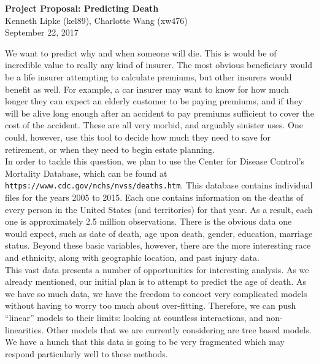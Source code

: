 \documentclass{article}
\begin{document}
\begin{center}
{\LARGE \textbf{Project Proposal: Predicting Death}}\\
{\large Kenneth Lipke (kel89), Charlotte Wang (xw476)}\\
September 22, 2017
\end{center}

We want to predict why and when someone will die. This is would be of incredible value to really any kind of insurer. The most obvious beneficiary would be a life insurer attempting to calculate premiums, but other insurers would benefit as well. For example, a car insurer may want to know for how much longer they can expect an elderly customer to be paying premiums, and if they will be alive long enough after an accident to pay premiums sufficient to cover the cost of the accident. These are all very morbid, and arguably sinister uses. One could, however, use this tool to decide how much they need to save for retirement, or when they need to begin estate planning. \\

In order to tackle this question, we plan to use the Center for Disease Control's Mortality Database, which can be found at \texttt{https://www.cdc.gov/nchs/nvss/deaths.htm}. This database contains individual files for the years 2005 to 2015. Each one contains information on the deaths of every person in the United States (and territories) for that year. As a result, each one is approximately 2.5 million observations. There is the obvious data one would expect, such as date of death, age upon death, gender, education, marriage status. Beyond these basic variables, however, there are the more interesting race and ethnicity, along with geographic location, and past injury data. \\

This vast data presents a number of opportunities for interesting analysis. As we already mentioned, our initial plan is to attempt to predict the age of death. As we have so much data, we have the freedom to concoct very complicated models without having to worry too much about over-fitting. Therefore, we can push ``linear'' models to their limits: looking at countless interactions, and non-linearities. Other models that we are currently considering are tree based models. We have a hunch that this data is going to be very fragmented which may respond particularly well to these methods. \\
\end{document}

